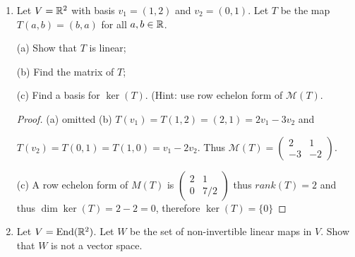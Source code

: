 \documentclass{amsart}
\begin{document}
\begin{enumerate}
(b) Is $v_3$ in $\s(v_1,v_2,v_4)$? If so, write $v_3$ as a linear combination of them.

(Hint: You may use: permuted LU factorization; some properties about matrix multiplication and invertible maps. )

\begin{proof}
	\color{blue} 
	(a) No, the rank of the matrix is $3$ (from the number of pivots), therefore the column span has dimension $3$ which is smaller than $\dim(\rr^4)=4$.
	
	(b) Let $w_1,\cdots,w_4$ be the column vector of the row echelon form $U$ of $A$. 
	Use LU factorization, we know that $PA=LU$, where $U$ is the row echelon form above. In other words, $A=P^{-1}LU$, and set $P^{-1}L=K$. We know that $P$ and $L$ are all products of invertible matrices so $K$ must be also invertible. By properties of matrix product, we have that $w_i=K v_i$. Since $w_1,\cdots,w_4$ are in row echelon form, we know that $w_1,w_2,w_4$ (the columns that contain a pivot) form a basis of the column space. Therefore, by invertibility of $K$, $v_1=K^{-1}w_1,v_2=K^{-1}w_2,v_4=K^{-1}w_4$ also form a basis of the column space, thus $v_3\in \s(v_1,v_2,v_4)$. 
	
	From the row echelon form matrix, we know that $w_3=3w_1-2w_2$, thus $K^{-1}w_3=3K^{-1}w_1-2K^{-1}w_2$, thus $v_3=3v_1-2v_2$.
\end{proof}
\item Let $V=\mathbb{R}^2$ with basis $v_1 = (1,2)$ and $v_2= (0,1)$. Let $T$ be the map $T(a,b)=(b,a)$ for all $a,b\in\mathbb{R}$.

(a) Show that $T$ is linear;

(b) Find the matrix of $T$;

(c) Find a basis for $\ker(T)$. (Hint: use row echelon form of $\mathcal{M}(T)$. 
\begin{proof}
	\color{blue}
	(a) omitted
	(b) $T(v_1)=T(1,2)=(2,1)=2v_1-3v_2$ and 
	
	$T(v_2)=T(0,1)=T(1,0)= v_1-2v_2$. Thus $\mathcal{M}(T)=\begin{pmatrix}
		2&1\\-3&-2
	\end{pmatrix}$.
	
	(c) A row echelon form of $M(T)$ is $\begin{pmatrix}
		2&1\\0&7/2
	\end{pmatrix}$ thus $rank(T)=2$ and thus $\dim\ker(T)=2-2=0$, therefore $\ker(T)=\{0\}$\end{proof}
\item Let $V=\text{End}({\mathbb{R}^2})$. Let $W$ be the set of non-invertible linear maps in $V$. Show that $W$ is not a vector space.


\end{enumerate}
\end{document}
